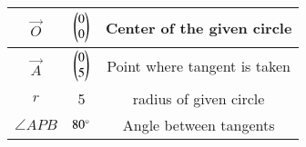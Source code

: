 
\begin{tabular}[]{|c|c|c|}
\hline
$\vec{O}$	& $\begin{pmatrix}0\\0\end{pmatrix}$ &Center of the given circle \\ \hline
$\vec{A}$	& $\begin{pmatrix}0\\5\end{pmatrix}$ &Point where tangent is taken\\ \hline
$r$		& 5 & radius of given circle \\ \hline
$\angle{APB}$ 		& $80\degree$ & Angle between tangents\\ \hline
\end{tabular}
